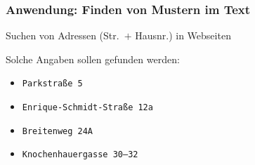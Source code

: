     \begin{frame}
      \frametitle{Anwendung: Finden von Mustern im Text}
      
       Suchen von Adressen (Str.\ $+$ Hausnr.) in Webseiten
      \par\smallskip
      Solche Angaben sollen gefunden werden:
      \begin{itemize}
        \item[]
          \texttt{Parkstraße 5}
          \par\vspace{-1mm}
        \item[]
          \texttt{Enrique-Schmidt-Straße 12a}
          \par\vspace{-1mm}
        \item[]
          \texttt{Breitenweg 24A}
          \par\vspace{-1mm}
        \item[]
          \texttt{Knochenhauergasse 30--32}
      \end{itemize}
\end{frame}
